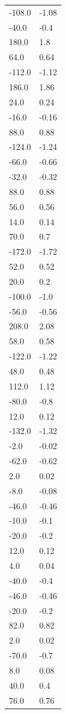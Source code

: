 \begin{longtable}{ll}
-108.0 & -1.08 \\
-40.0 & -0.4 \\
180.0 & 1.8 \\
64.0 & 0.64 \\
-112.0 & -1.12 \\
186.0 & 1.86 \\
24.0 & 0.24 \\
-16.0 & -0.16 \\
88.0 & 0.88 \\
-124.0 & -1.24 \\
-66.0 & -0.66 \\
-32.0 & -0.32 \\
88.0 & 0.88 \\
56.0 & 0.56 \\
14.0 & 0.14 \\
70.0 & 0.7 \\
-172.0 & -1.72 \\
52.0 & 0.52 \\
20.0 & 0.2 \\
-100.0 & -1.0 \\
-56.0 & -0.56 \\
208.0 & 2.08 \\
58.0 & 0.58 \\
-122.0 & -1.22 \\
48.0 & 0.48 \\
112.0 & 1.12 \\
-80.0 & -0.8 \\
12.0 & 0.12 \\
-132.0 & -1.32 \\
-2.0 & -0.02 \\
-62.0 & -0.62 \\
2.0 & 0.02 \\
-8.0 & -0.08 \\
-46.0 & -0.46 \\
-10.0 & -0.1 \\
-20.0 & -0.2 \\
12.0 & 0.12 \\
4.0 & 0.04 \\
-40.0 & -0.4 \\
-46.0 & -0.46 \\
-20.0 & -0.2 \\
82.0 & 0.82 \\
2.0 & 0.02 \\
-70.0 & -0.7 \\
8.0 & 0.08 \\
40.0 & 0.4 \\
76.0 & 0.76 \\

\end{longtable}
